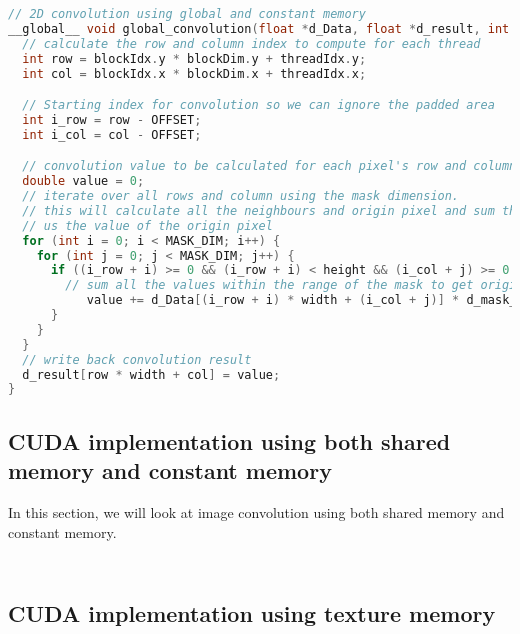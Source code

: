 \begin{lstlisting}[language=C, label={lst: global_convolution}, caption= 2D Convolution using the global memory]
// 2D convolution using global and constant memory
__global__ void global_convolution(float *d_Data, float *d_result, int width, int height) {
  // calculate the row and column index to compute for each thread
  int row = blockIdx.y * blockDim.y + threadIdx.y;
  int col = blockIdx.x * blockDim.x + threadIdx.x;

  // Starting index for convolution so we can ignore the padded area
  int i_row = row - OFFSET;
  int i_col = col - OFFSET;

  // convolution value to be calculated for each pixel's row and column
  double value = 0;
  // iterate over all rows and column using the mask dimension.
  // this will calculate all the neighbours and origin pixel and sum these values to give
  // us the value of the origin pixel
  for (int i = 0; i < MASK_DIM; i++) {
    for (int j = 0; j < MASK_DIM; j++) {
      if ((i_row + i) >= 0 && (i_row + i) < height && (i_col + j) >= 0 && (i_col + j) < width) {
      	// sum all the values within the range of the mask to get origin pixel's value
           value += d_Data[(i_row + i) * width + (i_col + j)] * d_mask_global[i * MASK_DIM + j];
      }
    }
  }
  // write back convolution result
  d_result[row * width + col] = value;
}
\end{lstlisting}


\subsection{CUDA implementation using both shared memory and constant memory}
In this section, we will look at image convolution using both shared memory and constant memory.

\begin{lstlisting}[language=C, label={lst: mask_shared}, caption= Cache mask in to the constant memory]

\end{lstlisting}


\begin{lstlisting}[language=C, label={lst: shared_convolution}, caption= 2D Convolution using the shared memory]

\end{lstlisting}


\subsection{CUDA implementation using texture memory}


